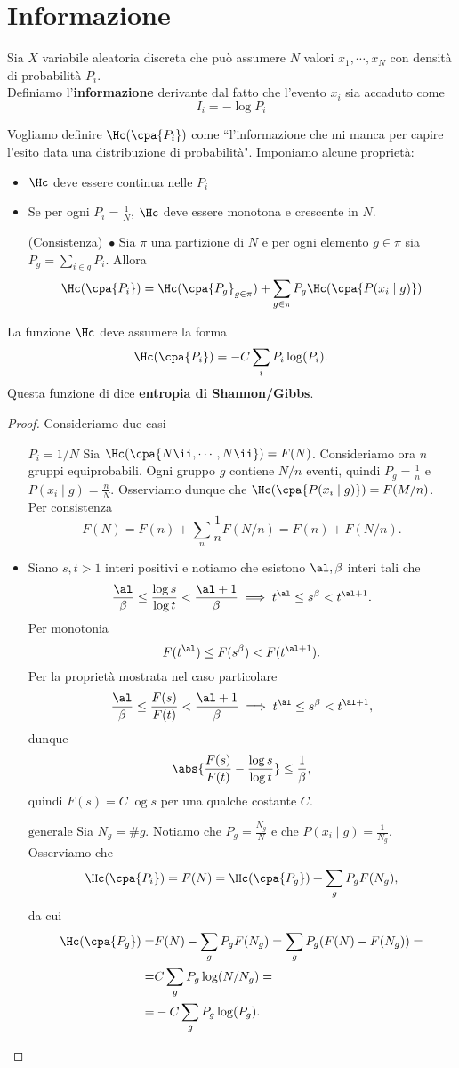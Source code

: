 \section{Informazione}
\begin{definition}[Informazione]
Sia $X$ variabile aleatoria discreta che pu\`o assumere $N$ valori $x_1,\cdots, x_N$ con densit\`a di probabilit\`a $P_i$.\\
Definiamo l'\textbf{informazione} derivante dal fatto che l'evento $x_i$ sia accaduto come
\[I_i=-\log P_i\]
\end{definition}
Vogliamo definire $\Hc(\cpa{P_i})$ come ``l'informazione che mi manca per capire l'esito data una distribuzione di probabilit\`a". Imponiamo alcune propriet\`a:
\begin{itemize}
\item $\Hc$ deve essere continua nelle $P_i$
\item Se per ogni $P_i=\frac1N$, $\Hc$ deve essere monotona e crescente in $N$.
\item [(Consistenza)\ $\bullet$] Sia $\pi$ una partizione di $N$ e per ogni elemento $g\in \pi$ sia $P_g=\sum_{i\in g}P_i$. Allora
\[\Hc(\cpa{P_i})=\Hc(\cpa{P_g}_{g\in \pi})+\sum_{g\in \pi} P_g\Hc(\cpa{P(x_i\mid g)})\]
\end{itemize}
\begin{theorem}
La funzione $\Hc$ deve assumere la forma
\[\Hc(\cpa{P_i})=-C\sum_i P_i\log(P_i).\]
Questa funzione di dice \textbf{entropia di Shannon/Gibbs}.
\end{theorem}
\begin{proof}
Consideriamo due casi
\setlength{\leftmargini}{0cm}
\begin{itemize}
\item[$\boxed{P_i=1/N}$] Sia $\Hc(\cpa{N\ii,\cdots, N\ii})=F(N)$. Consideriamo ora $n$ gruppi equiprobabili. Ogni gruppo $g$ contiene $N/n$ eventi, quindi $P_g=\frac1n$ e $P(x_i\mid g)=\frac nN$. Osserviamo dunque che $\Hc(\cpa{P(x_i\mid g)})=F(M/n)$. Per consistenza
\[F(N)=F(n)+\sum_n\frac1nF(N/n)=F(n)+F(N/n).\] 
\item Siano $s,t>1$ interi positivi e notiamo che esistono $\al,\beta$ interi tali che
\[\frac\al\beta\leq\frac{\log s}{\log t}<\frac{\al+1}\beta\implies t^\al\leq s^\beta<t^{\al+1}.\]
Per monotonia
\[F(t^\al)\leq F(s^\beta)<F(t^{\al+1}).\]
Per la propriet\`a mostrata nel caso particolare
\[\frac\al\beta\leq\frac{F(s)}{F(t)}<\frac{\al+1}\beta\implies t^\al\leq s^\beta<t^{\al+1},\]
dunque
\[\abs{\frac{F(s)}{F(t)}-\frac{\log s}{\log t}}\leq \frac1\beta,\]
quindi $F(s)=C\log s$ per una qualche costante $C$.
\item[$\boxed{\text{generale}}$] Sia $N_g=\#g$. Notiamo che $P_g=\frac{N_g}N$ e che $P(x_i\mid g)=\frac1{N_g}$. Osserviamo che
\[\Hc(\cpa{P_i})=F(N)=\Hc(\cpa{P_g})+\sum_g P_g F(N_g),\]
da cui
\begin{align*}
\Hc(\cpa{P_g})=& F(N)-\sum_g P_g F(N_g)=\sum_g P_g(F(N)-F(N_g))=\\
=& C\sum_g P_g\log(N/N_g)=\\
=&-C\sum_g P_g\log(P_g).
\end{align*}
\end{itemize}
\setlength{\leftmargini}{0.5cm}
\end{proof}

